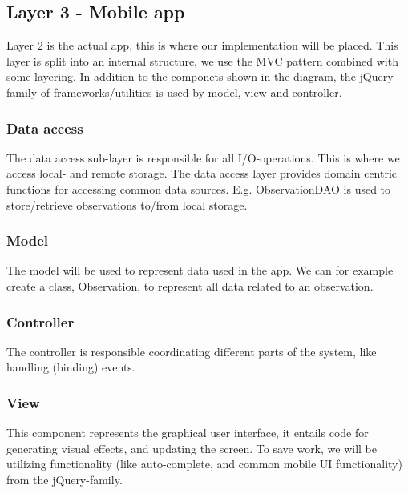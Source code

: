 \subsection{Layer 3 - Mobile app}

Layer 2 is the actual app, this is where our implementation will be placed.
This layer is split into an internal structure, we use the MVC pattern combined
with some layering. In addition to the componets shown in the diagram, the
jQuery-family of frameworks/utilities is used by model, view and controller.

	\subsubsection{Data access}
	
	The data access sub-layer is responsible for all I/O-operations. This is
	where we access local- and remote storage. The data access layer provides
	domain centric functions for accessing common data sources. E.g.
	ObservationDAO is used to store/retrieve observations to/from local storage.

	\subsubsection{Model}

	The model will be used to represent data used in the app. We can for example
	create a class, Observation, to represent all data related to an
	observation.

	\subsubsection{Controller}

	The controller is responsible coordinating different parts of the system,
	like handling (binding) events.

	\subsubsection{View}

	This component represents the graphical user interface, it entails code for
	generating visual effects, and updating the screen. To save work, we will be
	utilizing functionality (like auto-complete, and common mobile UI
	functionality) from the jQuery-family.
